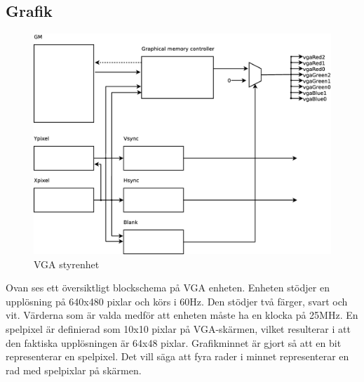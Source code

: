 \subsection{Grafik}
	\begin{center}
		\begin{figure}[H]
	    \centering
			\includegraphics[scale=0.30]{../grafik/graphics.eps}
			\caption{VGA styrenhet}
			\label{fig:vga}
		\end{figure}
	\end{center}
Ovan ses ett översiktligt blockschema på VGA enheten. Enheten stödjer en upplösning på 640x480 pixlar och körs i 60Hz. Den stödjer två färger, svart och vit. Värderna som är valda medför att enheten måste ha en klocka på 25MHz. En spelpixel är definierad som 10x10 pixlar på VGA-skärmen, vilket resulterar i att den faktiska upplösningen är 64x48 pixlar. Grafikminnet är gjort så att en bit representerar en spelpixel. Det vill säga att fyra rader i minnet representerar en rad med spelpixlar på skärmen.
